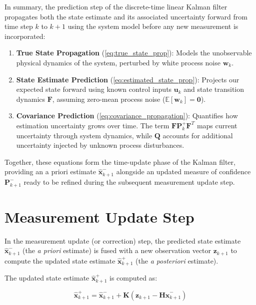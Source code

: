 \documentclass{article}
\begin{document}
	In summary, the prediction step of the discrete-time linear Kalman filter propagates both the state estimate and its associated uncertainty forward from time step $k$ to $k+1$ using the system model before any new measurement is incorporated:
	\begin{enumerate}
		\item \textbf{True State Propagation} (\ref{eq:true_state_prop}): Models the unobservable physical dynamics of the system, perturbed by white process noise $\mathbf{w}_{k}$.
		\item \textbf{State Estimate Prediction} (\ref{eq:estimated_state_prop}): Projects our expected state forward using known control inputs $\mathbf{u}_{k}$ and state transition dynamics $\mathbf{F}$, assuming zero-mean process noise ($\mathbb{E}[\mathbf{w}_{k}] = \mathbf{0}$).
		\item \textbf{Covariance Prediction} (\ref{eq:covariance_propagation}): Quantifies how estimation uncertainty grows over time. The term $\mathbf{F} \mathbf{P}_{k}^+ \mathbf{F}^T$ maps current uncertainty through system dynamics, while $\mathbf{Q}$ accounts for additional uncertainty injected by unknown process disturbances.
	\end{enumerate}
	
	Together, these equations form the time-update phase of the Kalman filter, providing an a priori estimate $\hat{\mathbf{x}}_{k+1}^-$ alongside an updated measure of confidence $\mathbf{P}_{k+1}^-$ ready to be refined during the subsequent measurement update step.
	
	\section{Measurement Update Step}
	
	In the measurement update (or correction) step, the predicted state estimate $\hat{\mathbf{x}}_{k+1}^{-}$ (the \emph{a priori} estimate) is fused with a new observation vector $\mathbf{z}_{k+1}$ to compute the updated state estimate $\hat{\mathbf{x}}_{k+1}^{+}$ (the \emph{a posteriori} estimate).
	
	
	\noindent The updated state estimate $\hat{\mathbf{x}}_{k+1}^+$ is computed as:
	
	\begin{equation}
		\hat{\mathbf{x}}_{k+1}^+ = \hat{\mathbf{x}}_{k+1}^- + \mathbf{K} \left( \mathbf{z}_{k+1} - \mathbf{H} \hat{\mathbf{x}}_{k+1}^- \right)
		\label{eq:state_update}
	\end{equation}
	
\end{document}
